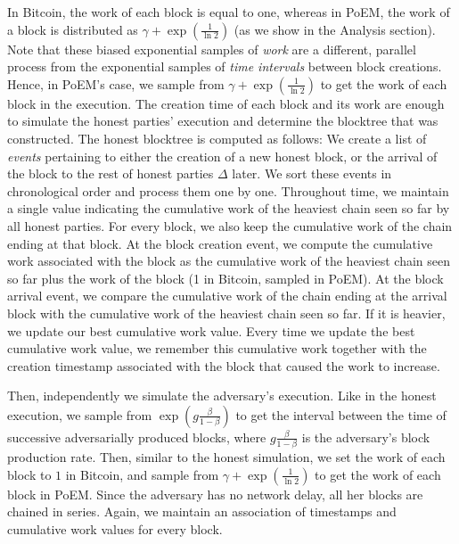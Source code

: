 In Bitcoin, the work of each block is equal to one,
whereas in PoEM, the work of a block is
distributed as $\gamma + \exp(\frac{1}{\ln2})$ (as we show in the Analysis section). Note that these biased exponential samples of \emph{work} are a different,
parallel process from the exponential samples of \emph{time intervals} between block creations.
Hence, in PoEM's case, we sample from $\gamma + \exp(\frac{1}{\ln2})$ to get the work
of each block in the execution. The creation time of each block and its work are enough to simulate the honest parties' execution
and determine the blocktree that was constructed.
The honest blocktree is computed as follows: We create a list of \emph{events} pertaining to either the creation of a new honest block,
or the arrival of the block to the rest of honest parties $\Delta$ later. We sort these events in chronological order and process them one by one.
Throughout time, we maintain a single value indicating the cumulative work of the heaviest chain seen so far by all honest parties.
For every block, we also keep the cumulative work of the chain ending at that block.
At the block creation event, we compute the cumulative work associated with the block as the cumulative work of the
heaviest chain seen so far plus the work of the block (1 in Bitcoin, sampled in PoEM). At the block arrival event, we compare the
cumulative work of the chain ending at the arrival block with the cumulative work of the heaviest chain seen so far.
If it is heavier, we update our best cumulative work value. Every time we update the best cumulative work value,
we remember this cumulative work together with the creation timestamp associated with the block that caused the work to increase.

Then, independently we simulate the adversary's execution. Like in the honest execution, we sample from $\exp(g\frac{\beta}{1 - \beta})$
to get the interval between the time of successive adversarially produced blocks, where $g\frac{\beta}{1 - \beta}$ is the adversary's block production rate.
Then, similar to the honest simulation, we set the work of each block to $1$ in Bitcoin, and sample from $\gamma + \exp(\frac{1}{\ln2})$ to get the work of each block in PoEM.
Since the adversary has no network delay, all her blocks are chained in series.
Again, we maintain an association of timestamps and cumulative work values for every block.

